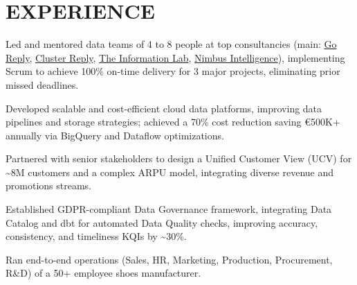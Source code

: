 \documentclass[]{deedy-resume-reversed}
\begin{document}
\begin{minipage}[t]{0.60\textwidth}


\section{EXPERIENCE}

\vspace{\topsep} %
\begin{tightemize}
\item Led and mentored data teams of 4 to 8 people at top consultancies (main: \href{https://www.reply.com/go-reply/}{Go Reply}, \href{https://www.reply.com/cluster-reply/}{Cluster Reply}, \href{https://www.theinformationlab.it/}{The Information Lab}, \href{https://nimbusintelligence.com/}{Nimbus Intelligence}), implementing Scrum to achieve 100\% on-time delivery for 3 major projects, eliminating prior missed deadlines.

\item Developed scalable and cost-efficient cloud data platforms, improving data pipelines and storage strategies; achieved a 70\% cost reduction saving €500K+ annually via BigQuery and Dataflow optimizations.

\item Partnered with senior stakeholders to design a Unified Customer View (UCV) for \~{}8M customers and a complex ARPU model, integrating diverse revenue and promotions streams.

\item Established GDPR-compliant Data Governance framework, integrating Data Catalog and dbt for automated Data Quality checks, improving accuracy, consistency, and timeliness KQIs by \~{}30\%.
\end{tightemize}

\sectionsep
{}
\begin{tightemize}
\item Ran end-to-end operations (Sales, HR, Marketing, Production, Procurement, R\&D) of a 50+ employee shoes manufacturer.


\end{tightemize}
\end{minipage}
\end{document}
